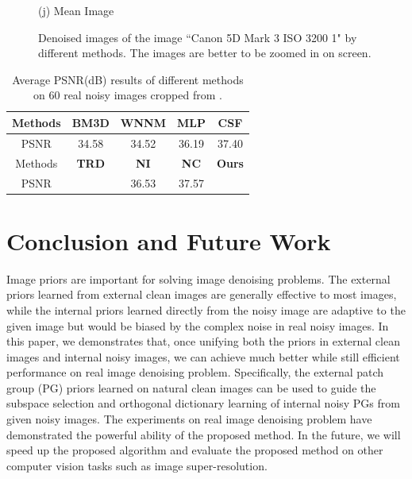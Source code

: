 \documentclass[10pt,twocolumn,letterpaper]{article}
\begin{document}
\begin{figure}
{\begin{minipage}[t]{0.195\textwidth}
{\footnotesize (j) Mean Image \cite{crosschannel2016}}
\end{minipage}
}\vspace{-1mm}
\caption{Denoised images of the image ``Canon 5D Mark 3 ISO 3200 1" by different methods. The images are better to be zoomed in on screen.}
\vspace{-1mm}
\label{fig6}
\end{figure}


\begin{table}
\caption{Average PSNR(dB) results of different methods on 60 real noisy images cropped from \cite{crosschannel2016}.}
\vspace{-3mm}
\label{tab3}
\begin{center}
\renewcommand\arraystretch{1}
\begin{tabular}{|c||c|c|c|c|}
\hline
 Methods& \textbf{BM3D}&\textbf{WNNM}&\textbf{MLP}&\textbf{CSF}
\\
\hline
PSNR &   34.58 & 34.52 & 36.19 & 37.40
\\
\hline
Methods& \textbf{TRD}& \textbf{NI}& \textbf{NC} &\textbf{Ours} 
\\
\hline
PSNR &  {\color{blue}{37.75}} & 36.53 & 37.57  & {\color{red}{ 38.75}}
\\
\hline
\end{tabular}
\end{center}\vspace{-8mm}
\end{table}


\section{Conclusion and Future Work}

Image priors are important for solving image denoising problems. The external priors learned from external clean images are generally effective to most images, while the internal priors learned directly from the noisy image are adaptive to the given image but would be biased by the complex noise in real noisy images. In this paper, we demonstrates that, once unifying both the priors in external clean images and internal noisy images, we can achieve much better while still efficient performance on real image denoising problem. Specifically, the external patch group (PG) priors learned on natural clean images can be used to guide the subspace selection and orthogonal dictionary learning of internal noisy PGs from given noisy images. The experiments on real image denoising problem have demonstrated the powerful ability of the proposed method. In the future, we will speed up the proposed algorithm and evaluate the proposed method on other computer vision tasks such as image super-resolution.

\clearpage
{
\small


}
\end{document}

